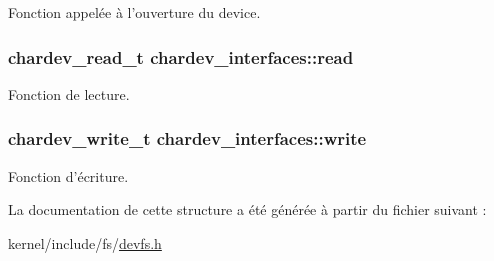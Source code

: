Fonction appelée à l'ouverture du device. \hypertarget{structchardev__interfaces_afeba560360e6a5dfff549d78c220b68b}{
\subsubsection[{read}]{\setlength{\rightskip}{0pt plus 5cm}chardev\-\_\-read\-\_\-t chardev\-\_\-interfaces\-::read}}\label{structchardev__interfaces_afeba560360e6a5dfff549d78c220b68b}
Fonction de lecture. \hypertarget{structchardev__interfaces_a6f70961f2f888de24d500d50bae85a3f}{
\subsubsection[{write}]{\setlength{\rightskip}{0pt plus 5cm}chardev\-\_\-write\-\_\-t chardev\-\_\-interfaces\-::write}}\label{structchardev__interfaces_a6f70961f2f888de24d500d50bae85a3f}
Fonction d'écriture. 

La documentation de cette structure a été générée à partir du fichier suivant \-:\begin{DoxyCompactItemize}
\item 
kernel/include/fs/\hyperlink{devfs_8h}{devfs.\-h}\end{DoxyCompactItemize}
